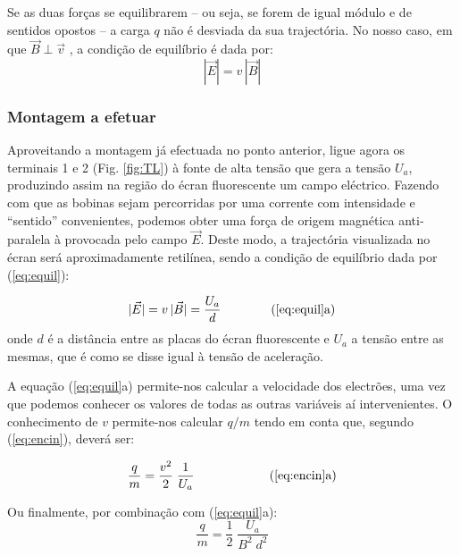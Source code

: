 \documentclass[a4paper,twoside,12pt]{article}      %
\begin{document}
Se as duas forças se equilibrarem -- ou seja, se forem de igual módulo e de sentidos opostos -- a carga $q$ não é desviada da sua trajectória. No nosso caso, em que $\vec{B} \perp \vec{v}$ , a condição de equilíbrio é dada por:
\begin{equation}
	\label{eq:equil}
 |\vec{E}| = v\, |\vec{B}|
\end{equation}

\subsubsection{\sf Montagem a efetuar}

Aproveitando a montagem já efectuada no ponto anterior, ligue agora os terminais 1 e 2 (Fig. \ref{fig:TL}) à fonte de alta tensão que gera a tensão $U_a$, produzindo assim na região do écran fluorescente um campo eléctrico. Fazendo com que as bobinas sejam percorridas por uma corrente com intensidade e  ``sentido'' convenientes, podemos obter uma força de origem magnética anti-paralela à provocada pelo campo $\vec{E}$. 
Deste modo, a trajectória visualizada no écran será aproximadamente retilínea, sendo a condição de equilíbrio dada por (\ref{eq:equil}):

\begin{equation*}
 |\vec{E}| = v\, |\vec{B}| = \frac{U_a}{d} \qquad  \qquad  \textrm{(\ref{eq:equil}a)}
\end{equation*}
onde $d$ é a distância entre as placas do écran fluorescente e $U_a$ a tensão entre as mesmas, que é como se disse igual à tensão de aceleração.

A equação (\ref{eq:equil}a) permite-nos calcular a velocidade dos electrões, uma vez que podemos conhecer os valores de todas as outras variáveis aí intervenientes. O conhecimento de $v$ permite-nos calcular $q/m$ tendo em conta que, segundo (\ref{eq:encin}), deverá ser:

\begin{equation*}
\frac{q}{m} = \frac{v^2}{2} \; \frac{1}{U_a} \qquad \qquad \qquad  \textrm{(\ref{eq:encin}a)}
\end{equation*}

Ou finalmente, por combinação com (\ref{eq:equil}a):
\begin{equation}
\frac{q}{m} = \frac{1}{2} \; \frac{U_a}{B^2\; d^2} 
\end{equation}
\end{document}
